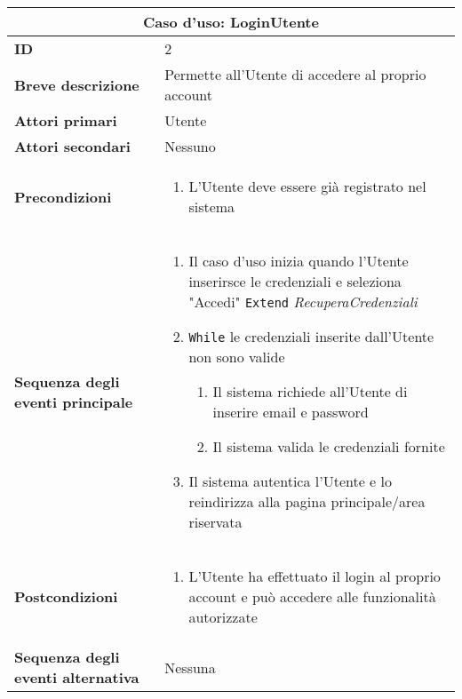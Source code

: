 \documentclass[a4paper]{report}
\begin{document}
\clearpage
\begin{table}[H]
\vspace*{-0cm}
\renewcommand{\arraystretch}{1.9}
\begin{tabular}{|p{3.9cm}|p{9.9cm}|}
\hline
\multicolumn{2}{|c|}{\textbf{Caso d’uso: LoginUtente}} \\ \hline
\textbf{ID} & 2 \\ \hline
\textbf{Breve descrizione} &  Permette all’Utente di accedere al proprio account\\ \hline
\textbf{Attori primari} & Utente \\ \hline
\textbf{Attori secondari} & Nessuno \\ \hline
\textbf{Precondizioni} & \begin{enumerate}[leftmargin=14pt,label=\arabic*.,labelsep=0.5em,topsep=0pt,partopsep=0pt,parsep=0pt,itemsep=0pt]
    \item L’Utente deve essere già registrato nel sistema 
\end{enumerate}\\ \hline
\textbf{Sequenza degli eventi principale} & \begin{enumerate}[leftmargin=14pt,label=\arabic*.,labelsep=0.5em,topsep=0pt,partopsep=0pt,parsep=0pt,itemsep=0pt]
    \item Il caso d’uso inizia quando l’Utente inserirsce le credenziali e seleziona "Accedi" \newline \texttt{Extend} \textit{RecuperaCredenziali}
    \item \texttt{While} le credenziali inserite dall’Utente non sono valide
    \begin{enumerate}[label=\arabic{enumi}.\arabic*.,leftmargin=22pt,labelsep=0.5em,topsep=0pt,partopsep=0pt,parsep=0pt,itemsep=0pt]
        \item Il sistema richiede all’Utente di inserire email e password
        \item Il sistema valida le credenziali fornite
    \end{enumerate}
    \item Il sistema autentica l’Utente e lo reindirizza alla pagina principale/area riservata
\end{enumerate}\\ \hline
\textbf{Postcondizioni} & \begin{enumerate}[leftmargin=14pt,label=\arabic*.,labelsep=0.5em,topsep=0pt,partopsep=0pt,parsep=0pt,itemsep=0pt]
    \item L’Utente ha effettuato il login al proprio account e può accedere alle funzionalità autorizzate
    \end{enumerate} \\ \hline
\textbf{Sequenza degli eventi alternativa} & Nessuna \\ \hline
\end{tabular}
\end{table}
\end{document}
